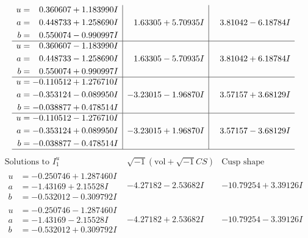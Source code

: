 \documentclass[1p]{elsarticle_modified}
\theoremstyle{definition}
\newcommand{\I}{\sqrt{-1}}
\begin{document}
$$\begin{array}{c|c|c}
\begin{aligned}
u &= \phantom{-}0.360607 + 1.183990 I \\
a &= \phantom{-}0.448733 + 1.258690 I \\
b &= \phantom{-}0.550074 - 0.990997 I\end{aligned}
 & \phantom{-}1.63305 + 5.70935 I & \phantom{-}3.81042 - 6.18784 I \\ \hline\begin{aligned}
u &= \phantom{-}0.360607 - 1.183990 I \\
a &= \phantom{-}0.448733 - 1.258690 I \\
b &= \phantom{-}0.550074 + 0.990997 I\end{aligned}
 & \phantom{-}1.63305 - 5.70935 I & \phantom{-}3.81042 + 6.18784 I \\ \hline\begin{aligned}
u &= -0.110512 + 1.276710 I \\
a &= -0.353124 - 0.089950 I \\
b &= -0.038877 + 0.478514 I\end{aligned}
 & -3.23015 - 1.96870 I & \phantom{-}3.57157 + 3.68129 I \\ \hline\begin{aligned}
u &= -0.110512 - 1.276710 I \\
a &= -0.353124 + 0.089950 I \\
b &= -0.038877 - 0.478514 I\end{aligned}
 & -3.23015 + 1.96870 I & \phantom{-}3.57157 - 3.68129 I\\
 \hline 
 \end{array}$$\newpage$$\begin{array}{c|c|c}  
\text{Solutions to }I^u_{1}& \I (\text{vol} + \sqrt{-1}CS) & \text{Cusp shape}\\
 \hline 
\begin{aligned}
u &= -0.250746 + 1.287460 I \\
a &= -1.43169 + 2.15528 I \\
b &= -0.532012 - 0.309792 I\end{aligned}
 & -4.27182 - 2.53682 I & -10.79254 + 3.39126 I \\ \hline\begin{aligned}
u &= -0.250746 - 1.287460 I \\
a &= -1.43169 - 2.15528 I \\
b &= -0.532012 + 0.309792 I\end{aligned}
 & -4.27182 + 2.53682 I & -10.79254 - 3.39126 I \\ \hline\begin{aligned}

\end{aligned}
\end{array}$$
\end{document}
